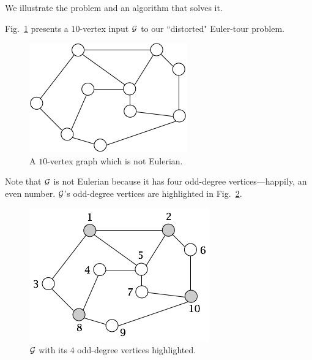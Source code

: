 \medskip

We illustrate the problem and an algorithm that solves it.

\smallskip

Fig.~\ref{fig:EulerianInitial} presents a $10$-vertex input $\mbox{$\cal G$}$ to our ``distorted" Euler-tour problem. 
\begin{figure}[hbt]
\begin{center}
       \includegraphics[scale=0.4]{FiguresGraph/EulerienInitial}
       \caption{A $10$-vertex graph which is not Eulerian.}
              \label{fig:EulerianInitial}
\end{center}
\end{figure}
Note that $\mbox{$\cal G$}$ is not Eulerian because it has four odd-degree vertices---happily, an even number.  $\mbox{$\cal G$}$'s odd-degree vertices are highlighted in Fig.~\ref{fig:EulerianVodd}.
\begin{figure}[hbt]
\begin{center}
       \includegraphics[scale=0.4]{FiguresGraph/EulerianVodd}
       \caption{$\mbox{$\cal G$}$ with its $4$ odd-degree vertices highlighted.}
              \label{fig:EulerianVodd}
\end{center}
\end{figure}

\smallskip


